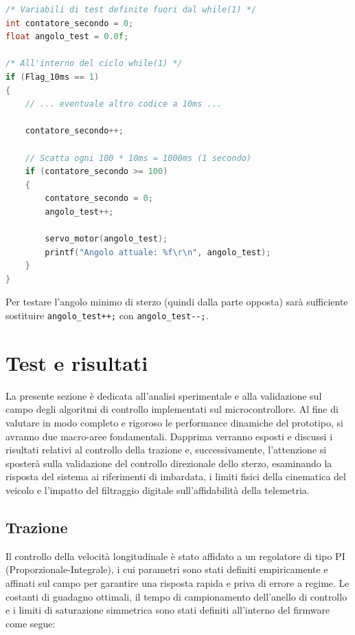 \documentclass[11pt]{report}
\begin{document}
\begin{lstlisting}[language=Cpp, caption={Loop del test per la calibrazione del servomotore}]
/* Variabili di test definite fuori dal while(1) */
int contatore_secondo = 0;
float angolo_test = 0.0f;

/* All'interno del ciclo while(1) */
if (Flag_10ms == 1) 
{
    // ... eventuale altro codice a 10ms ...

    contatore_secondo++;
    
    // Scatta ogni 100 * 10ms = 1000ms (1 secondo)
    if (contatore_secondo >= 100) 
    {
        contatore_secondo = 0;
        angolo_test++; 
        
        servo_motor(angolo_test);
        printf("Angolo attuale: %f\r\n", angolo_test);
    }
}
\end{lstlisting}
Per testare l'angolo minimo di sterzo (quindi dalla parte opposta) sarà sufficiente sostituire \verb|angolo_test++;| con \verb|angolo_test--;|.



\chapter{Test e risultati}
La presente sezione è dedicata all'analisi sperimentale e alla validazione sul campo degli algoritmi di controllo implementati sul microcontrollore. Al fine di valutare in modo completo e rigoroso le performance dinamiche del prototipo, si avranno due macro-aree fondamentali. Dapprima verranno esposti e discussi i risultati relativi al controllo della trazione e, successivamente, l'attenzione si sposterà sulla validazione del controllo direzionale dello sterzo, esaminando la risposta del sistema ai riferimenti di imbardata, i limiti fisici della cinematica del veicolo e l'impatto del filtraggio digitale sull'affidabilità della telemetria. 

\section{Trazione}
\noindent Il controllo della velocità longitudinale è stato affidato a un regolatore di tipo PI (Proporzionale-Integrale), i cui parametri sono stati definiti empiricamente e affinati sul campo per garantire una risposta rapida e priva di errore a regime.
\noindent Le costanti di guadagno ottimali, il tempo di campionamento dell'anello di controllo e i limiti di saturazione simmetrica sono stati definiti all'interno del firmware come segue:
\end{document}
